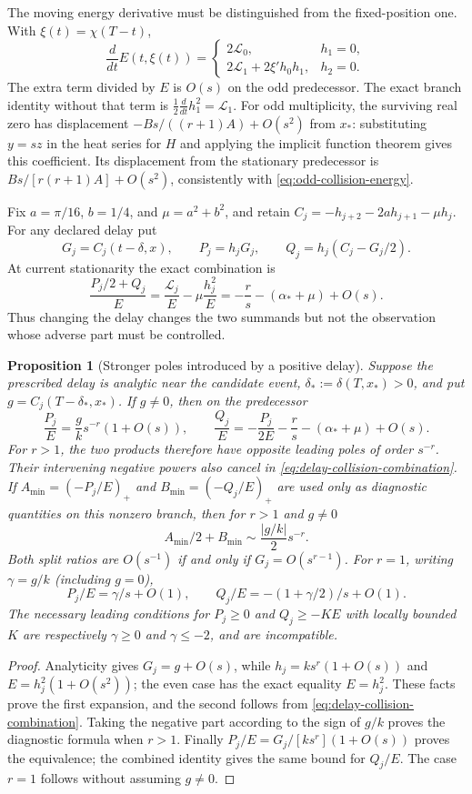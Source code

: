 \documentclass[11pt]{article}
\numberwithin{equation}{section}
\newtheorem{proposition}[theorem]{Proposition}
\theoremstyle{definition}
\theoremstyle{remark}
\newcommand{\Lag}{\mathcal L}
\begin{document}
The moving energy derivative must be distinguished from the fixed-position
one.  With $\xi(t)=\chi(T-t)$,
\[
 \frac d{dt}E(t,\xi(t))=
 \begin{cases}2\Lag_0,&h_1=0,\\
 2\Lag_1+2\xi' h_0h_1,&h_2=0.
 \end{cases}
\]
The extra term divided by $E$ is $O(s)$ on the odd predecessor.
The exact branch identity without that term is
$\frac12\frac d{dt}h_1^2=\Lag_1$.
For odd multiplicity, the surviving real zero has displacement
$-Bs/((r+1)A)+O(s^2)$ from $x_*$: substituting $y=sz$ in the heat
series for $H$ and applying the implicit function theorem gives this
coefficient.  Its displacement from the stationary predecessor is
$Bs/[r(r+1)A]+O(s^2)$, consistently with
\eqref{eq:odd-collision-energy}.

Fix $a=\pi/16$, $b=1/4$, and $\mu=a^2+b^2$, and retain
$C_j=-h_{j+2}-2ah_{j+1}-\mu h_j$.  For any declared delay put
\[
 G_j=C_j(t-\delta,x),\qquad P_j=h_jG_j,\qquad
 Q_j=h_j(C_j-G_j/2).
\]
At current stationarity the exact combination is
\begin{equation}
 \frac{P_j/2+Q_j}{E}
 =\frac{\Lag_j}{E}-\mu\frac{h_j^2}{E}
 =-\frac rs-(\alpha_*+\mu)+O(s).
 \label{eq:delay-collision-combination}
\end{equation}
Thus changing the delay changes the two summands but not the observation
whose adverse part must be controlled.

\begin{proposition}[Stronger poles introduced by a positive delay]
\label{prop:positive-delay-cancellation}
Suppose the prescribed delay is analytic near the candidate event,
$\delta_*:=\delta(T,x_*)>0$, and put
$g=C_j(T-\delta_*,x_*)$.  If $g\ne0$, then on the predecessor
\[
 \frac{P_j}{E}=\frac gk s^{-r}(1+O(s)),\qquad
 \frac{Q_j}{E}=-\frac{P_j}{2E}-\frac rs-(\alpha_*+\mu)+O(s).
\]
For $r>1$, the two products therefore have opposite leading poles of
order $s^{-r}$.  Their intervening negative powers also cancel in
\eqref{eq:delay-collision-combination}.  If
$A_{\min}=(-P_j/E)_+$ and $B_{\min}=(-Q_j/E)_+$ are used only as
diagnostic quantities on this nonzero branch, then for $r>1$ and $g\ne0$
\[
 A_{\min}/2+B_{\min}\sim\frac{|g/k|}{2}s^{-r}.
\]
Both split ratios are $O(s^{-1})$ if and only if
$G_j=O(s^{r-1})$.  For $r=1$, writing $\gamma=g/k$ (including
$g=0$),
\[
 P_j/E=\gamma/s+O(1),\qquad
 Q_j/E=-(1+\gamma/2)/s+O(1).
\]
The necessary leading conditions for $P_j\ge0$ and
$Q_j\ge-KE$ with locally bounded $K$ are respectively
$\gamma\ge0$ and $\gamma\le-2$, and are incompatible.
\end{proposition}
\begin{proof}
Analyticity gives $G_j=g+O(s)$, while
$h_j=ks^r(1+O(s))$ and $E=h_j^2(1+O(s^2))$; the even case has
the exact equality $E=h_j^2$.  These facts prove the first expansion,
and the second follows from \eqref{eq:delay-collision-combination}.
Taking the negative part according to the sign of $g/k$ proves the
diagnostic formula when $r>1$.  Finally
$P_j/E=G_j/[ks^r](1+O(s))$ proves the equivalence; the combined
identity gives the same bound for $Q_j/E$.  The case $r=1$ follows
without assuming $g\ne0$.
\end{proof}
\end{document}
